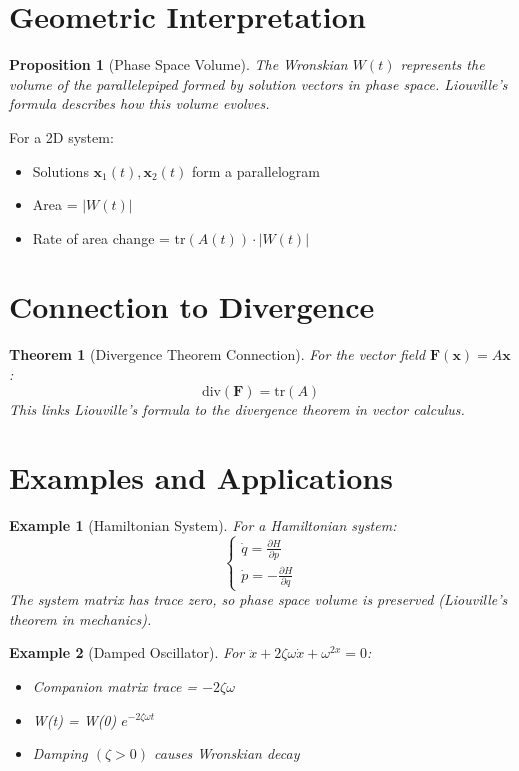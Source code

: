 \documentclass[12pt]{article}
\newtheorem{theorem}{Theorem}
\newtheorem{proposition}{Proposition}
\newtheorem{example}{Example}
\begin{document}
\section{Geometric Interpretation}

\begin{proposition}[Phase Space Volume]
The Wronskian $W(t)$ represents the volume of the parallelepiped formed by solution vectors in phase space. Liouville's formula describes how this volume evolves.
\end{proposition}

\begin{computation}
For a 2D system:
\begin{itemize}
\item Solutions $\mathbf{x}_{1}(t), \mathbf{x}_{2}(t)$ form a parallelogram
\item Area = $|W(t)|$
\item Rate of area change = $\text{tr}(A(t)) \cdot |W(t)|$
\end{itemize}
\end{computation}

\section{Connection to Divergence}

\begin{theorem}[Divergence Theorem Connection]
For the vector field $\mathbf{F}(\mathbf{x}) = A\mathbf{x}$:
$$\text{div}(\mathbf{F}) = \text{tr}(A)$$
This links Liouville's formula to the divergence theorem in vector calculus.
\end{theorem}

\section{Examples and Applications}

\begin{example}[Hamiltonian System]
For a Hamiltonian system:
$$\begin{cases}
\dot{q} = \frac{\partial H}{\partial p} \\
\dot{p} = -\frac{\partial H}{\partial q}
\end{cases}$$
The system matrix has trace zero, so phase space volume is preserved (Liouville's theorem in mechanics).
\end{example}

\begin{example}[Damped Oscillator]
For $\ddot{x} + 2\zeta\omega\dot{x} + \omega^{2x} = 0$:
\begin{itemize}
\item Companion matrix trace = $-2\zeta\omega$
\item W(t) = W(0) \cdot $e^{-2\zeta\omega t}$
\item Damping $(\zeta > 0)$ causes Wronskian decay
\end{itemize}
\end{example}
\end{document}
